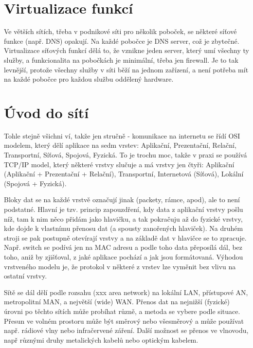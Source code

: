 \section{Virtualizace funkcí}

Ve větších sítích, třeba v podnikové síti pro několik poboček, se některé síťové funkce (např. DNS) opakují. Na každé pobočce je DNS server, což je zbytečné. Virtualizace síťových funkcí dělá to, že vznikne jeden server, který umí všechny ty služby, a funkcionalita na pobočkách je minimální, třeba jen firewall. Je to tak levnější, protože všechny služby v síti běží na jednom zařízení, a není potřeba mít na každé pobočce pro každou službu oddělený hardware.



\section{Úvod do sítí}

Tohle stejně všichni ví, takže jen stručně - komunikace na internetu se řídí OSI modelem, který dělí aplikace na sedm vrstev: Aplikační, Prezentační, Relační, Transportní, Síťová, Spojová, Fyzická. To je trochu moc, takže v praxi se používá TCP/IP model, který některé vrstvy slučuje a má vrstvy jen čtyři: Aplikační (Aplikační + Prezentační + Relační), Transportní, Internetová (Síťová), Lokální (Spojová + Fyzická).

Bloky dat se na každé vrstvě označují jinak (packety, rámce, apod), ale to není podstatné. Hlavní je tzv. princip zapouzdření, kdy data z aplikační vrstvy pošlu níž, tam k nim něco přidám jako hlavičku, a tak pokračuju až do fyzické vrstvy, kde dojde k vlastnímu přenosu dat (a spousty zanořených hlaviček). Na druhém stroji se pak postupně otevírají vrstvy a na základě dat v hlavičce se to zpracuje. Např. switch se podívá jen na MAC adresu a podle toho data přeposílá dál, bez toho, aniž by zjišťoval, z jaké aplikace pochází a jak jsou formátovaná. Výhodou vrstveného modelu je, že protokol v některé z vrstev lze vyměnit bez vlivu na ostatní vrstvy.

Sítě se dál dělí podle rozsahu (xxx area network) na lokální LAN, přístupové AN, metropolitní MAN, a největší (wide) WAN. Přenos dat na nejnižší (fyzické) úrovni po těchto sítích může probíhat různě, a metoda se vybere podle situace. Přesun ve volném prostoru může být směrový nebo všesměrový a může používat např. rádiové vlny nebo infračervené záření. Další možnost se přenos ve vlnovodu, např různými druhy metalických kabelů nebo optickým kabelem.

